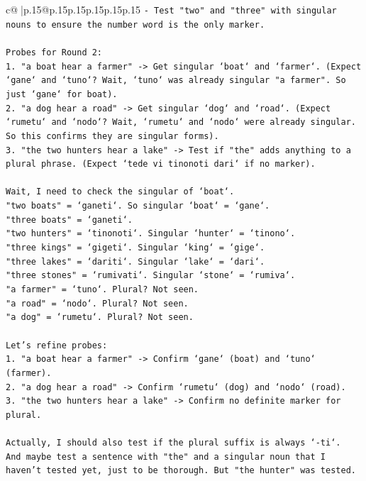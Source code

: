 \documentclass{article}
\begin{document}
{\begin{supertabular}{c@{$\;$}|p{.15\linewidth}@{}p{.15\linewidth}p{.15\linewidth}p{.15\linewidth}p{.15\linewidth}p{.15\linewidth}}
{{{\texttt{{-} Test "two" and "three" with singular nouns to ensure the number word is the only marker.} \\
\\ 
\texttt{Probes for Round 2:} \\
\texttt{1. "a boat hear a farmer" {-}> Get singular `boat` and `farmer`. (Expect `gane` and `tuno`? Wait, `tuno` was already singular "a farmer". So just `gane` for boat).} \\
\texttt{2. "a dog hear a road" {-}> Get singular `dog` and `road`. (Expect `rumetu` and `nodo`? Wait, `rumetu` and `nodo` were already singular. So this confirms they are singular forms).} \\
\texttt{3. "the two hunters hear a lake" {-}> Test if "the" adds anything to a plural phrase. (Expect `tede vi tinonoti dari` if no marker).} \\
\\ 
\texttt{Wait, I need to check the singular of `boat`.} \\
\texttt{"two boats" = `ganeti`. So singular `boat` = `gane`.} \\
\texttt{"three boats" = `ganeti`.} \\
\texttt{"two hunters" = `tinonoti`. Singular `hunter` = `tinono`.} \\
\texttt{"three kings" = `gigeti`. Singular `king` = `gige`.} \\
\texttt{"three lakes" = `dariti`. Singular `lake` = `dari`.} \\
\texttt{"three stones" = `rumivati`. Singular `stone` = `rumiva`.} \\
\texttt{"a farmer" = `tuno`. Plural? Not seen.} \\
\texttt{"a road" = `nodo`. Plural? Not seen.} \\
\texttt{"a dog" = `rumetu`. Plural? Not seen.} \\
\\ 
\texttt{Let's refine probes:} \\
\texttt{1. "a boat hear a farmer" {-}> Confirm `gane` (boat) and `tuno` (farmer).} \\
\texttt{2. "a dog hear a road" {-}> Confirm `rumetu` (dog) and `nodo` (road).} \\
\texttt{3. "the two hunters hear a lake" {-}> Confirm no definite marker for plural.} \\
\\ 
\texttt{Actually, I should also test if the plural suffix is always `{-}ti`.} \\
\texttt{And maybe test a sentence with "the" and a singular noun that I haven't tested yet, just to be thorough. But "the hunter" was tested.} \\
}}}
\end{supertabular}}
\end{document}
